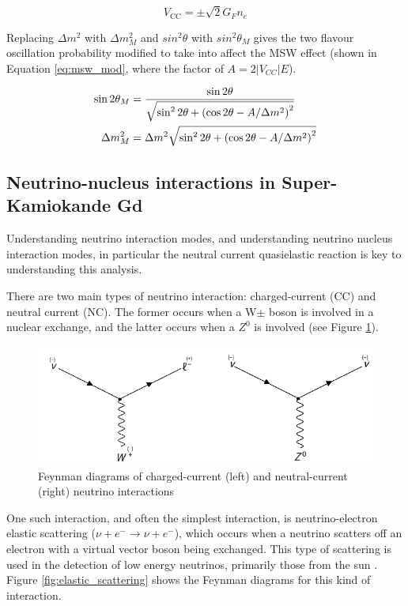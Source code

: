 \begin{equation}
    V_{\mathrm{CC}}=\pm \sqrt{2} G_{F} n_{e}
\label{eq:msw_vcc}
\end{equation}

Replacing $\Delta m^{2}$ with $\Delta m^{2}_{M}$ and $sin^{2}\theta$ with $sin^{2}\theta_{M}$ gives the two flavour oscillation probability modified to take into affect the MSW effect (shown in Equation \ref{eq:msw_mod}, where the factor of $A = 2|V_{CC}|E$).


\begin{align}
\sin 2 \theta_{M} &=\frac{\sin 2 \theta}{\sqrt{\sin ^{2} 2 \theta+\left(\cos 2 \theta-A / \Delta m^{2}\right)^{2}}} \label{eq:msw_mod}\\
\Delta m_{M}^{2} &=\Delta m^{2} \sqrt{\sin ^{2} 2 \theta+\left(\cos 2 \theta-A / \Delta m^{2}\right)^{2}} \notag
\end{align}



\subsection{Neutrino-nucleus interactions in Super-Kamiokande Gd}
Understanding neutrino interaction modes, and understanding neutrino nucleus interaction modes, in particular the neutral current quasielastic reaction is key to understanding this analysis. 

There are two main types of neutrino interaction: charged-current (CC) and neutral current (NC). The former occurs when a W$\pm$ boson is involved in a nuclear exchange, and the latter occurs when a $Z^{0}$ is involved (see Figure \ref{fig:CC_NC}).

\begin{figure}
    \centering
    \includegraphics[width=\textwidth]{Figures/CC_NC.png}
    \caption{Feynman diagrams of charged-current (left) and neutral-current (right) neutrino interactions}
    \label{fig:CC_NC}
\end{figure}


One such interaction, and often the simplest interaction, is neutrino-electron elastic scattering ($\nu+e^{-} \rightarrow \nu+e^{-}$), which occurs when a neutrino scatters off an electron with a virtual vector boson being exchanged. This type of scattering is used in the detection of low energy neutrinos, primarily those from the sun \cite{RevModPhys.59.505}. Figure \ref{fig:elastic_scattering} shows the Feynman diagrams for this kind of interaction.

